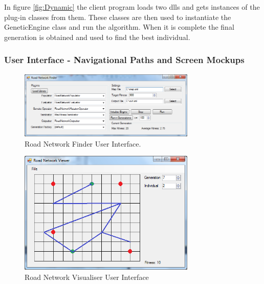 In figure \ref{fig:Dynamic} the client program loads two dlls and gets instances of the plug-in classes from them. These classes are then used to instantiate the GeneticEngine class and run the algorithm. When it is complete the final generation is obtained and used to find the best individual.

\clearpage

\subsubsection{User Interface - Navigational Paths and Screen Mockups}
\begin{figure}[ht!]
 \caption{Road Network Finder User Interface.}
 \centering
 \includegraphics[width=0.75\textwidth]{../Finder.png}
\end{figure}

\begin{figure}[ht!]
 \caption{Road Network Visualiser User Interface}
 \centering
 \includegraphics[width=0.75\textwidth]{../Visualiser.png}
\end{figure}

\clearpage



